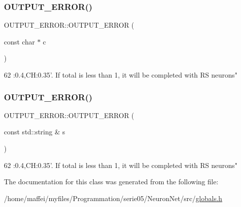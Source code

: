\subsubsection{\texorpdfstring{O\+U\+T\+P\+U\+T\+\_\+\+E\+R\+R\+O\+R()}{OUTPUT\_ERROR()}\hspace{0.1cm}{\footnotesize\ttfamily [1/2]}}
{\footnotesize\ttfamily O\+U\+T\+P\+U\+T\+\_\+\+E\+R\+R\+O\+R\+::\+O\+U\+T\+P\+U\+T\+\_\+\+E\+R\+R\+OR (\begin{DoxyParamCaption}\item[{const char $\ast$}]{c }\end{DoxyParamCaption})\hspace{0.3cm}{\ttfamily [inline]}}


\begin{DoxyCode}
62 :0.4,CH:0.35\textcolor{stringliteral}{'. If total is less than 1, it will be completed with RS neurons"}
\end{DoxyCode}
\mbox{\label{classOUTPUT__ERROR_abdf8edc6e3ea161cc5fac3bf6baffae1}} 
\subsubsection{\texorpdfstring{O\+U\+T\+P\+U\+T\+\_\+\+E\+R\+R\+O\+R()}{OUTPUT\_ERROR()}\hspace{0.1cm}{\footnotesize\ttfamily [2/2]}}
{\footnotesize\ttfamily O\+U\+T\+P\+U\+T\+\_\+\+E\+R\+R\+O\+R\+::\+O\+U\+T\+P\+U\+T\+\_\+\+E\+R\+R\+OR (\begin{DoxyParamCaption}\item[{const std\+::string \&}]{s }\end{DoxyParamCaption})\hspace{0.3cm}{\ttfamily [inline]}}


\begin{DoxyCode}
62 :0.4,CH:0.35\textcolor{stringliteral}{'. If total is less than 1, it will be completed with RS neurons"}
\end{DoxyCode}


The documentation for this class was generated from the following file\+:\begin{DoxyCompactItemize}
\item 
/home/maffei/myfiles/\+Programmation/serie05/\+Neuron\+Net/src/\hyperlink{globals_8h}{globals.\+h}\end{DoxyCompactItemize}
